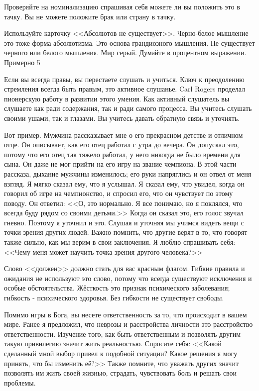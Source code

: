 \documentclass[10pt, fleqn]{article}
\begin{document}
Проверяйте на номинализацию спрашивая себя можете ли вы положить это в тачку. Вы не можете положите брак или страну в тачку.


Используйте карточку <<Абсолютов не существует>>. Черно-белое мышление это тоже форма абсолютизма. Это основа грандиозного мышления. Не существует черного или белого мышления. Мир серый. Думайте в процентном выражении. Примерно 5%


Если вы всегда правы, вы перестаете слушать и учиться. Ключ к преодолению стремления всегда быть правым, это активное слушанье. Carl Rogers проделал пионерскую работу в развитии этого умения. Как активный слушатель вы слушаете как ради содержания, так и ради самого процесса. Вы учитесь слушать своими ушами, так и глазами. Вы учитесь давать обратную связь и уточнять.

Вот пример. Мужчина рассказывает мне о его прекрасном детстве и отличном отце. Он описывает, как его отец работал с утра до вечера. Он допускал это, потому что его отец так тяжело работал, у него никогда не было времени для сына. Он даже не мог прийти на его игру на звание чемпиона. В этой части рассказа, дыхание мужчины изменилось; его руки напряглись и он отвел от меня взгляд. Я мягко сказал ему, что я услышал. Я сказал ему, что увидел, когда он говорил об игре на чемпионство, и спросил его, что он чувствует по этому поводу. Он ответил: <<О, это нормально. Я все понимаю, но я поклялся, что всегда буду рядом со своими детьми.>> Когда он сказал это, его голос звучал гневно. Поэтому я уточнил и это. Слушая и уточняя мы учимся видеть вещи с точки зрения других людей. Важно помнить, что другие верят в то, что говорят также сильно, как мы верим в свои заключения. Я люблю спрашивать себя: <<Чему меня может научить точка зрения другого человека?>>


Слово <<должен>> должно стать для вас красным флагом. Гибкие правила и ожидания не используют это слово, потому что всегда существуют исключения и особые обстоятельства. Жёсткость это признак психического заболевания; гибкость - психического здоровья. Без гибкости не существует свободы.


Помимо игры в Бога, вы несете ответственность за то, что происходит в вашем мире. Ранее я предложил, что неврозы и расстройства личности это расстройство ответственности. Изучение того, как быть ответственным и позволять другим такую привилегию значит жить реальностью. Спросите себя: <<Какой сделанный мной выбор привел к подобной ситуации? Какое решения я могу принять, что бы изменить её?>> Также помните, что уважать других значит позволять им жить своей жизнью, страдать, чувствовать боль и решать свои проблемы.
\end{document}
